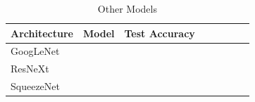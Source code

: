 \begin{table}[t]
\small
\begin{center}
\begin{tabular}{|p{1in}|c|c|c|c|c|c|c|}
\hline
Architecture 
 & Model
 & Test Accuracy \\
\hline
GoogLeNet & & \\
\hline
ResNeXt & & \\
\hline
SqueezeNet & & \\
\hline
\end{tabular}
\end{center}
\caption{Other Models}
\label{table:models}
\end{table}




\begin{figure}[!htb]
    \centering
    \subfigure[SqueezeNet]{
}
\end{figure}
